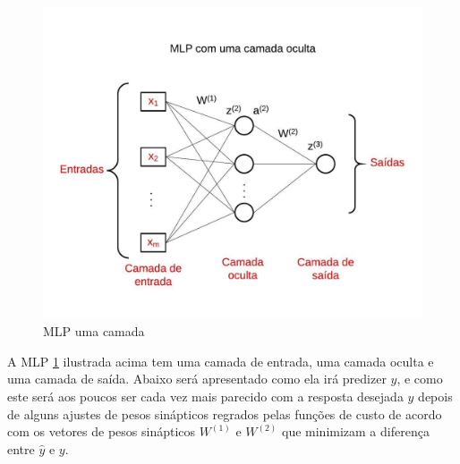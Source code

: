\begin{figure}[H]
    \centering
  \includegraphics[width=350pt]{figuras/MLP_uma_camada.jpeg}
  \caption{MLP uma camada}
  \label{fig:MLP uma camada}
\end{figure}

A MLP \ref{fig:MLP uma camada} ilustrada acima tem uma camada de entrada, uma camada oculta e uma camada de saída. Abaixo será apresentado como ela irá predizer $\hat{y}$, e como este será aos poucos ser cada vez mais parecido com a resposta desejada $y$ depois de alguns ajustes de pesos sinápticos regrados pelas funções de custo de acordo com os vetores de pesos sinápticos $W^{(1)}$ e $W^{(2)}$ que minimizam a diferença entre $\hat{y}$ e $y$.


